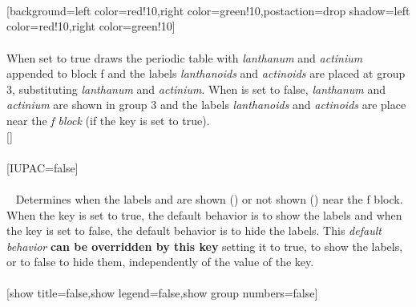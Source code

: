 \\ [10pt]\makebox[\linewidth][c]{\scalebox{.6}{\pgfPT[background={draw=red,line width=2pt,fill=red!10}]}}%
\\ [10pt]
\\ [-4pt][background={left color=red!10,right color=green!10,postaction={drop shadow={left color=red!10,right color=green!10}}}]%
\\ [10pt]\makebox[\linewidth][c]{\scalebox{.6}{\pgfPT[background={left color=red!10,right color=green!10,postaction={drop shadow={left color=red!10,right color=green!10}}}]}}%
\\ [5pt]\pgfPTendstyle%
\label{option_IUPAC}%
%
{When set to true draws the periodic table with \textit{lanthanum} and \textit{actinium} appended to block f and the labels \textit{lanthanoids} and \textit{actinoids} are placed at group 3, substituting \textit{lanthanum} and \textit{actinium}. When  is set to false, \textit{lanthanum} and \textit{actinium} are shown in group 3 and the labels \textit{lanthanoids} and \textit{actinoids} are place near the \textit{f block} (if the key  is set to true).
}%
\\ [5pt][]%
\\ [10pt]\makebox[\linewidth][c]{\scalebox{.6}{\pgfPT}}%
\\ [10pt][IUPAC=false]%
\\ [10pt]\makebox[\linewidth][c]{\scalebox{.6}{\pgfPT[IUPAC=false]}}%
\\ [5pt]\pgfPTendoption%
\newpage\vspace{-34pt}\ %
\label{option_show label LaAc}%
%
{Determines when the labels  and  are shown () or not shown () near the f block. When the  key is set to true, the default behavior is to show the labels and when the  key is set to false, the default behavior is to hide the labels. This \textit{default behavior} \textbf{can be overridden by this key} setting it to true, to show the labels, or to false to hide them, independently of the value of the  key.
}%
\\ [5pt]%
%
\\ [-4pt][show title=false,show legend=false,show group numbers=false]%
